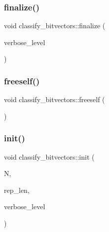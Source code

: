\mbox{\label{classclassify__bitvectors_adf8a59f998312b4fcc60361e87bcc6cb}} 
\subsubsection{\texorpdfstring{finalize()}{finalize()}}
{\footnotesize\ttfamily void classify\+\_\+bitvectors\+::finalize (\begin{DoxyParamCaption}\item[{\mbox{\hyperlink{galois_8h_a09fddde158a3a20bd2dcadb609de11dc}{I\+NT}}}]{verbose\+\_\+level }\end{DoxyParamCaption})}

\mbox{\label{classclassify__bitvectors_abfe5cfa8e3d64cda768e5181e19fbf3c}} 
\subsubsection{\texorpdfstring{freeself()}{freeself()}}
{\footnotesize\ttfamily void classify\+\_\+bitvectors\+::freeself (\begin{DoxyParamCaption}{ }\end{DoxyParamCaption})}

\mbox{\label{classclassify__bitvectors_aaae32847cc6f4de57361bf9a1eaa073f}} 
\subsubsection{\texorpdfstring{init()}{init()}}
{\footnotesize\ttfamily void classify\+\_\+bitvectors\+::init (\begin{DoxyParamCaption}\item[{\mbox{\hyperlink{galois_8h_a09fddde158a3a20bd2dcadb609de11dc}{I\+NT}}}]{N,  }\item[{\mbox{\hyperlink{galois_8h_a09fddde158a3a20bd2dcadb609de11dc}{I\+NT}}}]{rep\+\_\+len,  }\item[{\mbox{\hyperlink{galois_8h_a09fddde158a3a20bd2dcadb609de11dc}{I\+NT}}}]{verbose\+\_\+level }\end{DoxyParamCaption})}

